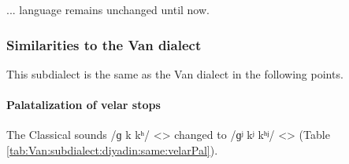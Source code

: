 ... language remains unchanged until now. 


\subsubsection{Similarities to the Van dialect}
This subdialect is the same as the Van dialect in the following points. 



\paragraph{Palatalization of velar stops}



The Classical sounds /ɡ k kʰ/ <> changed to /ɡʲ kʲ kʰʲ/ <> (Table \ref{tab:Van:subdialect:diyadin:same:velarPal}). 

